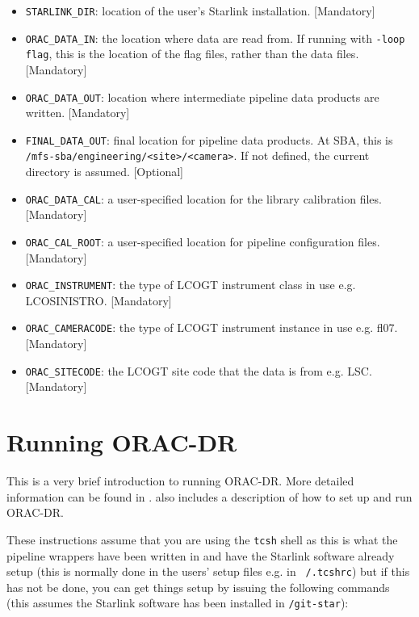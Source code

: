 \documentclass[twoside,11pt,nolof]{starlink}
\providecommand{\ORACDR}{{\footnotesize ORAC-DR}}
\providecommand{\task}[1]{\textsf{#1}}
\begin{document}
\begin{itemize}

\item \verb+STARLINK_DIR+: location of the user's Starlink
  installation. [Mandatory]

\item \verb+ORAC_DATA_IN+: the location where data are read from. If
  running with \verb+-loop flag+, this is the location of the flag
  files, rather than the data files. [Mandatory]

\item \verb+ORAC_DATA_OUT+: location where intermediate pipeline data products are
  written. [Mandatory]

\item \verb+FINAL_DATA_OUT+: final location for pipeline data products. At SBA,
  this is \\ \verb+/mfs-sba/engineering/<site>/<camera>+. If not defined, the current
  directory is assumed. [Optional]

\item \verb+ORAC_DATA_CAL+: a user-specified location for
  the library calibration files. [Mandatory]

\item \verb+ORAC_CAL_ROOT+: a user-specified location for
  pipeline configuration files. [Mandatory]

\item \verb+ORAC_INSTRUMENT+: the type of LCOGT instrument class in use e.g.
\task{LCOSINISTRO}. [Mandatory]

\item \verb+ORAC_CAMERACODE+: the type of LCOGT instrument instance in use e.g.
\task{fl07}. [Mandatory]

\item \verb+ORAC_SITECODE+: the LCOGT site code that the data is from  e.g.
\task{LSC}. [Mandatory]

\end{itemize}

\section{Running ORAC-DR}

This is a very brief introduction to running \ORACDR. More detailed
information can be found in .
 also includes a description of how to set up
and run \ORACDR.

These instructions assume that you are using the \texttt{tcsh} shell as this is
what the pipeline wrappers have been written in and have the Starlink software
already setup (this is normally done in the users' setup files e.g. in
\texttt{~/.tcshrc}) but if this has not be done, you can get things setup by
issuing the following commands (this assumes the Starlink software has been
installed in \texttt{/git-star}):
\end{document}
